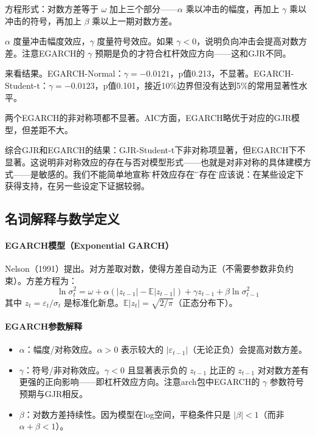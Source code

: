 \documentclass[11pt,a4paper]{article}
\begin{document}
方程形式：对数方差等于 \(\omega\) 加上三个部分——\(\alpha\) 乘以冲击的幅度，再加上 \(\gamma\) 乘以冲击的符号，再加上 \(\beta\) 乘以上一期对数方差。

\(\alpha\) 度量冲击幅度效应，\(\gamma\) 度量符号效应。如果 \(\gamma < 0\)，说明负向冲击会提高对数方差。注意EGARCH的 \(\gamma\) 预期是负的才符合杠杆效应方向——这和GJR不同。

来看结果。EGARCH-Normal：\(\gamma = -0.0121\)，p值0.213，不显著。EGARCH-Student-t：\(\gamma = -0.0123\)，p值0.101，接近10\%边界但没有达到5\%的常用显著性水平。

两个EGARCH的非对称项都不显著。AIC方面，EGARCH略优于对应的GJR模型，但差距不大。

综合GJR和EGARCH的结果：GJR-Student-t下非对称项显著，但EGARCH下不显著。这说明非对称效应的存在与否对模型形式——也就是对非对称的具体建模方式——是敏感的。我们不能简单地宣称\"杠杆效应存在\"或\"不存在\"，应该说：在某些设定下获得支持，在另一些设定下证据较弱。

\subsection*{名词解释与数学定义}

\paragraph{EGARCH模型（Exponential GARCH）} Nelson（1991）提出。对方差取对数，使得方差自动为正（不需要参数非负约束）。方差方程为：
\[
\ln\sigma_t^2 = \omega + \alpha(|z_{t-1}| - \mathbb{E}|z_{t-1}|) + \gamma z_{t-1} + \beta \ln\sigma_{t-1}^2
\]
其中 \(z_t = \varepsilon_t / \sigma_t\) 是标准化新息。\(\mathbb{E}|z_t| = \sqrt{2/\pi}\)（正态分布下）。

\paragraph{EGARCH参数解释}
\begin{itemize}[nosep]
\item \(\alpha\)：幅度/对称效应。\(\alpha > 0\) 表示较大的 \(|\varepsilon_{t-1}|\)（无论正负）会提高对数方差。
\item \(\gamma\)：符号/非对称效应。\(\gamma < 0\) 且显著表示负的 \(z_{t-1}\) 比正的 \(z_{t-1}\) 对对数方差有更强的正向影响——即杠杆效应方向。注意arch包中EGARCH的 \(\gamma\) 参数符号预期与GJR相反。
\item \(\beta\)：对数方差持续性。因为模型在log空间，平稳条件只是 \(|\beta| < 1\)（而非 \(\alpha + \beta < 1\)）。
\end{itemize}
\end{document}
